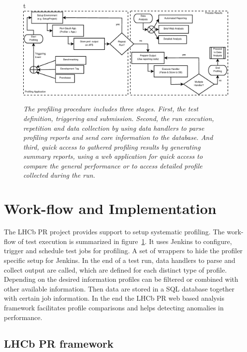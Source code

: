 \documentclass[a4paper]{jpconf}
\begin{document}
\begin{figure}{t}
\includegraphics[scale=0.3]{figures/profiling_process.eps}
\caption{\small \textit{The profiling procedure includes three stages. First, the test definition, triggering and submission. Second, the run execution, repetition and data collection by using data handlers to parse profiling reports and send core information to the database. And third, quick access to gathered profiling results by generating summary reports, using a web application for quick access to compare the general performance or to access detailed profile collected during the run.}}
\label{fig:profiling_process}
\end{figure}

\section{Work-flow and Implementation}
\label{sec:workflow_and_implementation}

The LHCb PR project provides support to setup systematic profiling. The work-flow of test execution is summarized in \mbox{figure \ref{fig:profiling_process}}. It uses Jenkins to configure, trigger and schedule test jobs for profiling. A set of wrappers to hide the profiler specific setup for Jenkins. In the end of a test run, data handlers to parse and collect output are called, which are defined for each distinct type of profile. Depending on the desired information profiles can be filtered or combined with other available information. Then data are stored in a SQL database together with certain job information. In the end the LHCb PR web based analysis framework facilitates profile comparisons and helps detecting anomalies in performance.

\subsection{LHCb PR framework}
\label{sec:lhcbpr_framework}
\end{document}
